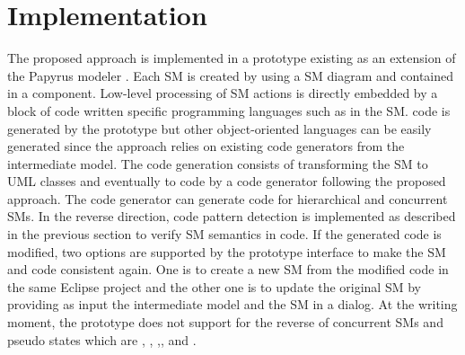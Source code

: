 \section{Implementation}
\label{sec:implementation}

The proposed approach is implemented in a prototype existing as an extension of the Papyrus modeler \cite{cea-list_papyrus_????}. Each SM is created by using a SM diagram and contained in a component. Low-level processing of SM actions is directly embedded by a block of code written specific programming languages such as  in the SM.  code is generated by the prototype but other object-oriented languages can be easily generated since the approach relies on existing code generators from the intermediate model. The code generation consists of transforming the SM to UML classes and eventually to code by a code generator following the proposed approach. The code generator can generate code for hierarchical and concurrent SMs. In the reverse direction, code pattern detection is implemented as described in the previous section to verify SM semantics in code. If the generated code is modified, two options are supported by the prototype interface to make the SM and code consistent again. One is to create a new SM from the modified code in the same Eclipse project and the other one is to update the original SM by providing as input the intermediate model and the SM in a dialog. At the writing moment, the prototype does not support for the reverse of concurrent SMs and pseudo states which are , , ,, and .